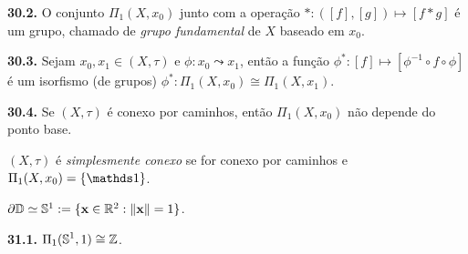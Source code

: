 \begin{theorem}
    \textbf{30.2.} O conjunto \(\Pi_1(X, x_0)\) junto com a operação \(* : ([f] , [g]) \mapsto [f*g]\) é um grupo, chamado de \emph{grupo fundamental} de \(X\) baseado em \(x_0\). 
\end{theorem}

\begin{proposition}
    \textbf{30.3.} Sejam \(x_0, x_1 \in (X,\tau)\) e \(\phi : x_0 \leadsto x_1\), então a função \(\phi^*: [f]\mapsto [\phi^{-1} \circ f \circ \phi]\) é um isorfismo (de grupos) \(\phi^*: \Pi_1(X, x_0) \cong \Pi_1(X, x_1)\). \comentario{(\textcolor{rojoscuro}{Ex. 29.E.})}
\end{proposition}

\begin{corollary}
    \textbf{30.4.} Se \((X, \tau)\) é conexo por caminhos, então \(\Pi_1(X,x_0)\) não depende do ponto base. 
\end{corollary}

\begin{definition}
    \((X,\tau)\) é \emph{simplesmente conexo} se for conexo por caminhos e \(\Pi_1(X, x_0) = \{\id\}\). 
\end{definition}

\begin{definition}
    \centering \(\partial \mathbb{D} \simeq \mathbb{S}^1 := \{\textbf{x} \in \mathbb{R}^2 : \|\textbf{x}\| = 1\} \).
\end{definition}
\begin{theorem}
    \textbf{31.1.} \(\displaystyle \Pi_1(\mathbb{S}^1 , 1) \cong \mathbb{Z}\). 
\end{theorem}
